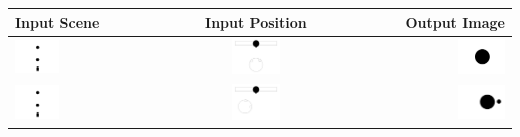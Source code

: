 \documentclass[11pt]{article}
\begin{document}
\begin{tabular}[pos]{| l | c | r |}
\hline
Input Scene & Input Position & Output Image
\\ \hline
\includegraphics[width=0.30\textwidth]{./img/input_scene1.png}
&
\includegraphics[width=0.30\textwidth]{./img/input_position1.png}
&
\includegraphics[width=0.30\textwidth]{./img/output1.png}
\\ \hline
\includegraphics[width=0.30\textwidth]{./img/input_scene2.png}
&
\includegraphics[width=0.30\textwidth]{./img/input_position2.png}
&
\includegraphics[width=0.30\textwidth]{./img/output2.png}

\end{tabular}
\end{document}
